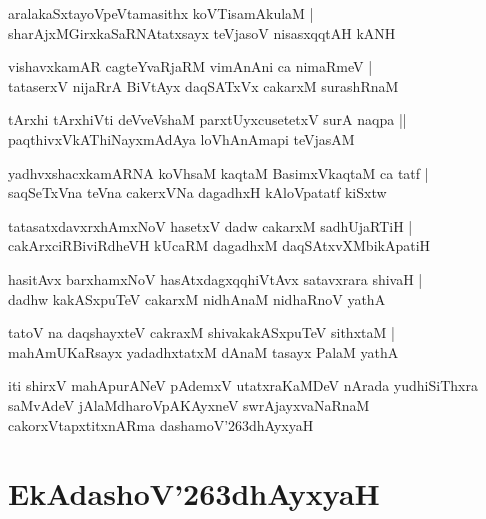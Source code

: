 \documentclass[twoside,12pt,openright]{book}
\def\S{\char'263}
\newcounter{shloka}[chapter]
\begin{document}
\begin{shloka}%
aralakaSxtayoVpeVtamasithx koVTisamAkulaM |\\
sharAjxMGirxkaSaRNAtatxsayx teVjasoV nisasxqqtAH kANH 
\end{shloka}

\begin{shloka}%
vishavxkamAR cagteYvaRjaRM vimAnAni ca nimaRmeV |\\
tataserxV nijaRrA BiVtAyx daqSATxVx cakarxM surashRnaM 
\end{shloka}

\begin{shloka}%
tArxhi tArxhiVti deVveVshaM parxtUyxcusetetxV surA naqpa ||\\
paqthivxVkAThiNayxmAdAya loVhAnAmapi teVjasAM 
\end{shloka}

\begin{shloka}%
yadhvxshacxkamARNA koVhsaM kaqtaM BasimxVkaqtaM ca tatf |\\
saqSeTxVna teVna cakerxVNa dagadhxH kAloVpatatf kiSxtw 
\end{shloka}

\begin{shloka}%
tatasatxdavxrxhAmxNoV hasetxV dadw cakarxM sadhUjaRTiH |\\
cakArxciRBiviRdheVH kUcaRM dagadhxM daqSAtxvXMbikApatiH
\end{shloka}

\begin{shloka}%
hasitAvx barxhamxNoV hasAtxdagxqqhiVtAvx satavxrara shivaH |\\
dadhw kakASxpuTeV cakarxM nidhAnaM nidhaRnoV yathA 
\end{shloka}

\begin{shloka}%
tatoV na daqshayxteV cakraxM shivakakASxpuTeV sithxtaM |\\
mahAmUKaRsayx yadadhxtatxM dAnaM tasayx PalaM yathA 
\end{shloka}

\begin{center}
iti shirxV mahApurANeV pAdemxV utatxraKaMDeV  nArada yudhiSiThxra saMvAdeV jAlaMdharoVpAKAyxneV swrAjayxvaNaRnaM 
cakorxVtapxtitxnARma dashamoV\S dhAyxyaH 
\end{center}

\chapter{EkAdashoV\S dhAyxyaH}
\end{document}
